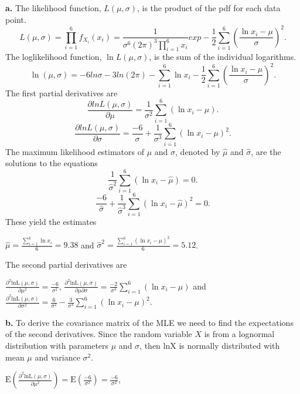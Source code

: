 \documentclass[]{book}
\theoremstyle{definition}
\theoremstyle{definition}
\theoremstyle{definition}
\theoremstyle{remark}
\begin{document}
\textbf{a.} The likelihood function, \(L\left( \mu,\sigma \right)\), is
the product of the pdf for each data point.
\[L\left( \mu,\sigma \right) = \prod_{i = 1}^{6}{f_{X_{i}}\left( x_{i} \right)} = \frac{1}{\sigma^{6}\left( 2\pi \right)^{3}\prod_{i = 1}^{6}x_{i}}exp - \frac{1}{2}\sum_{i = 1}^{6}\left( \frac{\ln x_{i} - \mu}{\sigma} \right)^{2}.\]
The loglikelihood function, \(\ln L \left( \mu,\sigma \right)\), is the
sum of the individual logarithms.
\[\ln \left( \mu,\sigma \right) = - 6ln\sigma - 3ln\left( 2\pi \right) - \sum_{i = 1}^{6}\ln x_{i} - \frac{1}{2}\sum_{i = 1}^{6}\left( \frac{\ln x_{i} - \mu}{\sigma} \right)^{2}.\]
The first partial derivatives are
\[\frac{\partial lnL\left( \mu,\sigma \right)}{\partial\mu} = \frac{1}{\sigma^{2}}\sum_{i = 1}^{6}\left( \ln x_{i} - \mu \right).\]
\[\frac{\partial lnL\left( \mu,\sigma \right)}{\partial\sigma} = \frac{- 6}{\sigma} + \frac{1}{\sigma^{3}}\sum_{i = 1}^{6}\left( \ln x_{i} - \mu \right)^{2}.\]
The maximum likelihood estimators of \(\mu\) and \(\sigma\), denoted by
\(\hat{\mu}\) and \(\hat{\sigma}\), are the solutions to the equations
\[\frac{1}{{\hat{\sigma}}^{2}}\sum_{i = 1}^{6}\left( \ln x_{i} - \hat{\mu} \right) = 0.\]
\[\frac{- 6}{\hat{\sigma}} + \frac{1}{{\hat{\sigma}}^{3}}\sum_{i = 1}^{6}\left( \ln x_{i} - \hat{\mu} \right)^{2} = 0.\]
These yield the estimates

\(\hat{\mu} = \frac{\sum_{i = 1}^{6}{\ln x_{i}}}{6} = 9.38\) and
\({\hat{\sigma}}^{2} = \frac{\sum_{i = 1}^{6}\left( \ln x_{i} - \hat{\mu} \right)^{2}}{6} = 5.12\).

The second partial derivatives are

\(\frac{\partial^{2}\text{lnL}\left( \mu,\sigma \right)}{\partial\mu^{2}} = \frac{- 6}{\sigma^{2}}\),
\(\frac{\partial^{2}\text{lnL}\left( \mu,\sigma \right)}{\partial\mu\partial\sigma} = \frac{- 2}{\sigma^{3}}\sum_{i = 1}^{6}\left( \ln x_{i} - \mu \right)\)
and
\(\frac{\partial^{2}\text{lnL}\left( \mu,\sigma \right)}{\partial\sigma^{2}} = \frac{6}{\sigma^{2}} - \frac{3}{\sigma^{4}}\sum_{i = 1}^{6}\left( \ln x_{i} - \mu \right)^{2}\).

\textbf{b.} To derive the covariance matrix of the MLE we need to find
the expectations of the second derivatives. Since the random variable
\(X\) is from a lognormal distribution with parameters \(\mu\) and
\(\sigma\), then \(\text{lnX}\) is normally distributed with mean
\(\mu\) and variance \(\sigma^{2}\).

\(\mathrm{E}\left( \frac{\partial^{2}\text{lnL}\left( \mu,\sigma \right)}{\partial\mu^{2}} \right) = \mathrm{E}\left( \frac{- 6}{\sigma^{2}} \right) = \frac{- 6}{\sigma^{2}}\),
\end{document}
